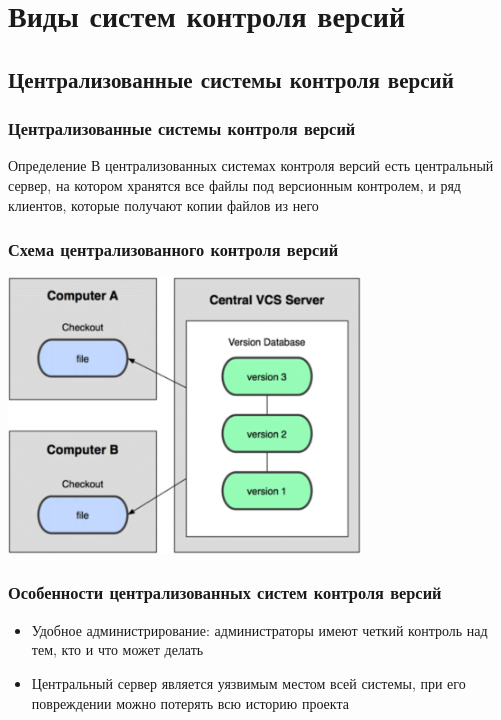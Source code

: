 \documentclass{../industrial-development}
\begin{document}
\section{Виды систем контроля версий}

\subsection{Централизованные системы контроля версий}

\begin{frame} \frametitle{Централизованные системы контроля версий}
  \begin{block}{Определение}
    В \alert{централизованных системах контроля версий} есть центральный сервер, на котором хранятся все файлы под версионным контролем, и ряд клиентов, которые получают копии файлов 
из него
  \end{block}
 
\end{frame}

\begin{frame} \frametitle{Схема централизованного контроля версий}
  \centerline{\includegraphics[width=0.7\textwidth]{centralizedVCS.pdf}}
\end{frame}

\begin{frame} \frametitle{Особенности централизованных систем контроля версий}
  \begin{itemize}
  \item Удобное администрирование: администраторы имеют четкий контроль над тем, кто и что может делать
  \item Центральный сервер является уязвимым местом всей системы, при его повреждении можно потерять всю историю проекта
  \end{itemize}
\end{frame}
\end{document}
